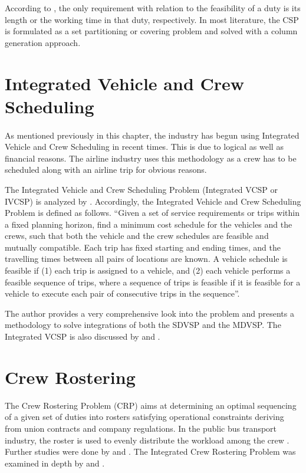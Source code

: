\documentclass[12pt, oneside]{report}
\begin{document}
According to \citep{Huisman2004}, the only requirement with relation to the feasibility of a duty is its length or the working time in that duty, respectively. In most literature, the CSP is formulated as a set partitioning or covering problem and solved with a column generation approach.

\section {Integrated Vehicle and Crew Scheduling}

\paragraph{ } As mentioned previously in this chapter, the industry has begun using Integrated Vehicle and Crew Scheduling in recent times. This is due to logical as well as financial reasons. The airline industry uses this methodology as a crew has to be scheduled along with an airline trip for obvious reasons.

The Integrated Vehicle and Crew Scheduling Problem (Integrated VCSP or IVCSP) is analyzed by \citet{Huisman2004}. Accordingly, the Integrated Vehicle and Crew Scheduling Problem is defined as follows. “Given a set of service requirements or trips within a fixed planning horizon, find a minimum cost schedule for the vehicles and the crews, such that both the vehicle and the crew schedules are feasible and mutually compatible. Each trip has fixed starting and ending times, and the travelling times between all pairs of locations are known. A vehicle schedule is feasible if (1) each trip is assigned to a vehicle, and (2) each vehicle performs a feasible sequence of trips, where a sequence of trips is feasible if it is feasible for a vehicle to execute each pair of consecutive trips in the sequence”.

The author provides a very comprehensive look into the problem and presents a methodology to solve integrations of both the SDVSP and the MDVSP. The Integrated VCSP is also discussed by \citet{Freling2000} and \citet{Wren1997}.

\section {Crew Rostering}

The Crew Rostering Problem (CRP) aims at determining an optimal sequencing of a given set of duties into rosters satisfying operational constraints deriving from union contracts and company regulations. In the public bus transport industry, the roster is used to evenly distribute the workload among the crew \citep{Caprara1995}. Further studies were done by \citep{Kharraziha2003} and \citep{Tian2012}. The Integrated Crew Rostering Problem was examined in depth by \citep{Valdes2010} and \citep{Xie2012}.
\end{document}
